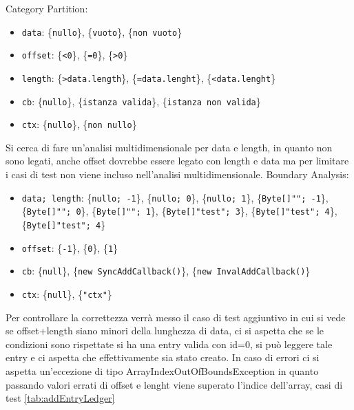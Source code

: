 \documentclass[10pt]{article}
\begin{document}
{		Category Partition:
		\begin{itemize}[label=--, itemsep=2pt, parsep=0pt]
			\item \texttt{data}: \{\texttt{nullo}\}, \{\texttt{vuoto}\}, \{\texttt{non vuoto}\}
			\item \texttt{offset}: \{\texttt{<0}\}, \{\texttt{=0}\}, \{\texttt{>0}\}
			\item \texttt{length}: \{\texttt{>data.length}\}, \{\texttt{=data.lenght}\}, \{\texttt{<data.lenght}\}
			\item \texttt{cb}: \{\texttt{nullo}\}, \{\texttt{istanza valida}\}, \{\texttt{istanza non valida}\}
			\item \texttt{ctx}: \{\texttt{nullo}\}, \{\texttt{non nullo}\}
		\end{itemize}
		Si cerca di fare un'analisi multidimensionale per data e length, in quanto non sono legati, anche offset dovrebbe essere legato con length e data ma per limitare i casi di test non viene incluso nell'analisi multidimensionale. 
		Boundary Analysis:
		\begin{itemize}[label=--, itemsep=2pt, parsep=0pt]
			\item \texttt{data; length}: \{\texttt{nullo; -1}\}, \{\texttt{nullo; 0}\}, \{\texttt{nullo; 1}\}, \{\texttt{Byte[]""; -1}\}, \{\texttt{Byte[]""; 0}\}, \{\texttt{Byte[]""; 1}\}, \{\texttt{Byte[]"test"; 3}\}, \{\texttt{Byte[]"test"; 4}\}, \{\texttt{Byte[]"test"; 4}\}
			\item \texttt{offset}: \{\texttt{-1}\}, \{\texttt{0}\}, \{\texttt{1}\}
			\item \texttt{cb}: \{\texttt{null}\}, \{\texttt{new SyncAddCallback()}\}, \{\texttt{new InvalAddCallback()}\}
			\item \texttt{ctx}: \{\texttt{null}\}, \{\texttt{"ctx"}\}
		\end{itemize}
		Per controllare la correttezza verrà messo il caso di test aggiuntivo in cui si vede se offset+length siano minori della lunghezza di data, ci si aspetta che se le condizioni sono rispettate si ha una entry valida con id=0, si può leggere tale entry e ci aspetta che effettivamente sia stato creato. In caso di errori ci si aspetta un'eccezione di tipo ArrayIndexOutOfBoundsException in quanto passando valori errati di offset e lenght viene superato l'indice dell'array, casi di test \autoref{tab:addEntryLedger}
		
}
\end{document}
